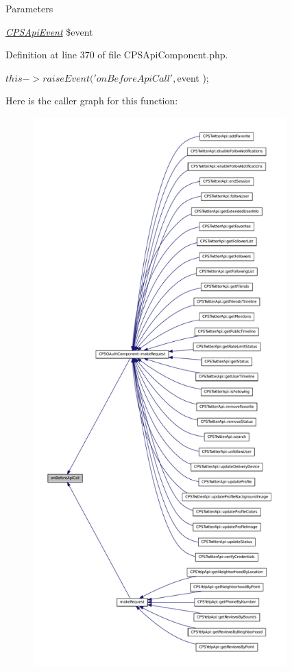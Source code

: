 \begin{DoxyParams}{Parameters}
\item[{\em \hyperlink{classCPSApiEvent}{CPSApiEvent}}]\$event \end{DoxyParams}


Definition at line 370 of file CPSApiComponent.php.




\begin{DoxyCode}
    {
        $this->raiseEvent( 'onBeforeApiCall', $event );
    }
\end{DoxyCode}




Here is the caller graph for this function:\nopagebreak
\begin{figure}[H]
\begin{center}
\leavevmode
\includegraphics[height=600pt]{classCPSApiComponent_a557a9b057d808b200135c94fca584e0e_icgraph}
\end{center}
\end{figure}


